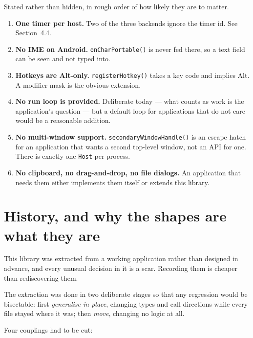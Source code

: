 \documentclass[11pt,a4paper]{article}
\begin{document}
Stated rather than hidden, in rough order of how likely they are to matter.

\begin{enumerate}[leftmargin=*]
\item \textbf{One timer per host.} Two of the three backends ignore the timer
  id. See Section~4.4.
\item \textbf{No IME on Android.} \texttt{onCharPortable()} is never fed there,
  so a text field can be seen and not typed into.
\item \textbf{Hotkeys are Alt-only.} \texttt{registerHotkey()} takes a key code
  and implies Alt. A modifier mask is the obvious extension.
\item \textbf{No run loop is provided.} Deliberate today --- what counts as work
  is the application's question --- but a default loop for applications that do
  not care would be a reasonable addition.
\item \textbf{No multi-window support.} \texttt{secondaryWindowHandle()} is an
  escape hatch for an application that wants a second top-level window, not an
  API for one. There is exactly one \texttt{Host} per process.
\item \textbf{No clipboard, no drag-and-drop, no file dialogs.} An application
  that needs them either implements them itself or extends this library.
\end{enumerate}

\section{History, and why the shapes are what they are}

This library was extracted from a working application rather than designed in
advance, and every unusual decision in it is a scar. Recording them is cheaper
than rediscovering them.

The extraction was done in two deliberate stages so that any regression would be
bisectable: first \emph{generalise in place}, changing types and call directions
while every file stayed where it was; then \emph{move}, changing no logic at all.

Four couplings had to be cut:
\end{document}
